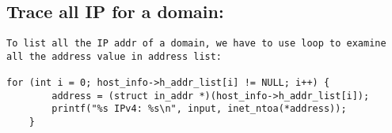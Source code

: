 \documentclass[12pt]{article}
\begin{document}
\subsection{Trace all IP for a domain:}
\begin{verbatim}
To list all the IP addr of a domain, we have to use loop to examine all the address value in address list:

for (int i = 0; host_info->h_addr_list[i] != NULL; i++) {
        address = (struct in_addr *)(host_info->h_addr_list[i]);
        printf("%s IPv4: %s\n", input, inet_ntoa(*address));
    }
\end{verbatim}

\clearpage
\end{document}

